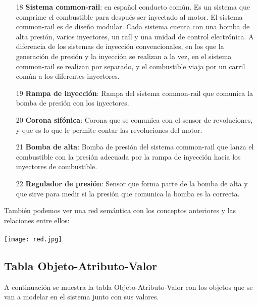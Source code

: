 \documentclass[a4paper,12pt]{article}
\begin{document}
\begin{itemize}
\item[18] \textbf{Sistema common-rail}: en español conducto común. Es un sistema que comprime el combustible para después ser inyectado al motor. El sistema common-rail es de diseño modular. Cada sistema cuenta con una bomba de alta presión, varios inyectores, un raíl y una unidad de control electrónica. A diferencia de los sistemas de inyección convencionales, en los que la generación de presión y la inyección se realizan a la vez, en el sistema common-rail se realizan por separado, y el combustible viaja por un carril común a los diferentes inyectores.
\item[19] \textbf{Rampa de inyección}: Rampa del sistema common-rail que comunica la bomba de presión con los inyectores.
\item[20] \textbf{Corona sifónica}: Corona que se comunica con el sensor de revoluciones, y que es lo que le permite contar las revoluciones del motor.
\item[21] \textbf{Bomba de alta}: Bomba de presión del sistema common-rail que lanza el combustible con la presión adecuada por la rampa de inyección hacia los inyectores de combustible.
\item[22] \textbf{Regulador de presión}: Sensor que forma parte de la bomba de alta y que sirve para medir si la presión que comunica la bomba es la correcta.
\end{itemize}

También podemos ver una red semántica con los conceptos anteriores y las relaciones entre ellos:\\\\
\texttt{[image: red.jpg]}

\newpage
\subsection{Tabla Objeto-Atributo-Valor}
A continuación se muestra la tabla Objeto-Atributo-Valor con los objetos que se van a modelar en el sistema junto con sus valores.
\end{document}
